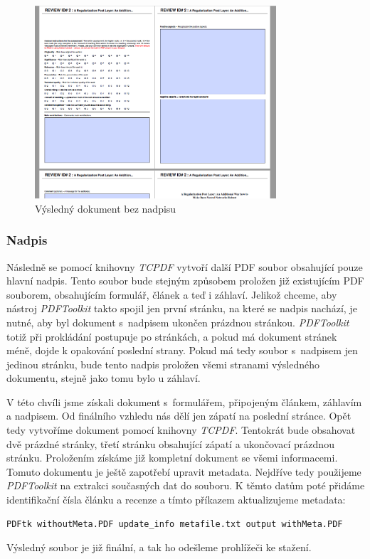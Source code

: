 \documentclass[czech,BP]{thesiskiv}
\begin{document}
\begin{figure}[h]
    \centering
    	\includegraphics[width=0.8\textwidth]{obr7.png}
    	\caption{Výsledný dokument bez nadpisu}
    	\label{kombinace2}
\end{figure}
\subsubsection{Nadpis}
Následně se pomocí knihovny \emph{TCPDF} vytvoří další PDF soubor obsahující pouze hlavní nadpis. Tento soubor bude stejným způsobem proložen již existujícím PDF souborem, obsahujícím formulář, článek a teď i záhlaví. Jelikož chceme, aby nástroj \emph{PDFToolkit} takto spojil jen první stránku, na které se nadpis nachází, je nutné, aby byl dokument s~nadpisem ukončen prázdnou stránkou. \emph{PDFToolkit} totiž při prokládání postupuje po stránkách, a pokud má dokument stránek méně, dojde k opakování poslední strany. Pokud má tedy soubor s~nadpisem jen jedinou stránku, bude tento nadpis proložen všemi stranami výsledného dokumentu, stejně jako tomu bylo u záhlaví. 

V této chvíli jsme získali dokument s~formulářem, připojeným článkem, záhlavím a nadpisem. Od finálního vzhledu nás dělí jen zápatí na poslední stránce. Opět tedy vytvoříme dokument pomocí knihovny \emph{TCPDF}. Tentokrát bude obsahovat dvě prázdné stránky, třetí stránku obsahující zápatí a ukončovací prázdnou stránku. Proložením získáme již kompletní dokument se všemi informacemi. Tomuto dokumentu je ještě zapotřebí upravit metadata. Nejdříve tedy použijeme \emph{PDFToolkit} na extrakci současných dat do souboru. K těmto datům poté přidáme identifikační čísla článku a recenze a tímto příkazem aktualizujeme metadata: 
\begin{lstlisting}
PDFtk withoutMeta.PDF update_info metafile.txt output withMeta.PDF
\end{lstlisting}
Výsledný soubor je již finální, a tak ho odešleme prohlížeči ke stažení.
\end{document}
